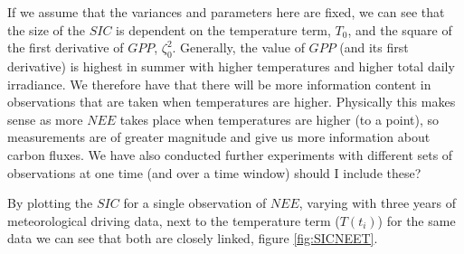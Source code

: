 \documentclass[11pt]{article}
\begin{document}
If we assume that the variances and parameters here are fixed, we can see that the size of the $SIC$ is dependent on the temperature term, $T_0$, and the square of the first derivative of $GPP$, $\zeta_0^{2}$. Generally, the value of $GPP$ (and its first derivative) is highest in summer with higher temperatures and higher total daily irradiance. We therefore have that there will be more information content in observations that are taken when temperatures are higher. Physically this makes sense as more $NEE$ takes place when temperatures are higher (to a point), so measurements are of greater magnitude and give us more information about carbon fluxes. {\color{red} We have also conducted further experiments with different sets of observations at one time (and over a time window) should I include these?}

By plotting the $SIC$ for a single observation of $NEE$, varying with three years of meteorological driving data, next to the temperature term ($T(t_i)$) for the same data we can see that both are closely linked, figure \ref{fig:SICNEET}.
\end{document}
